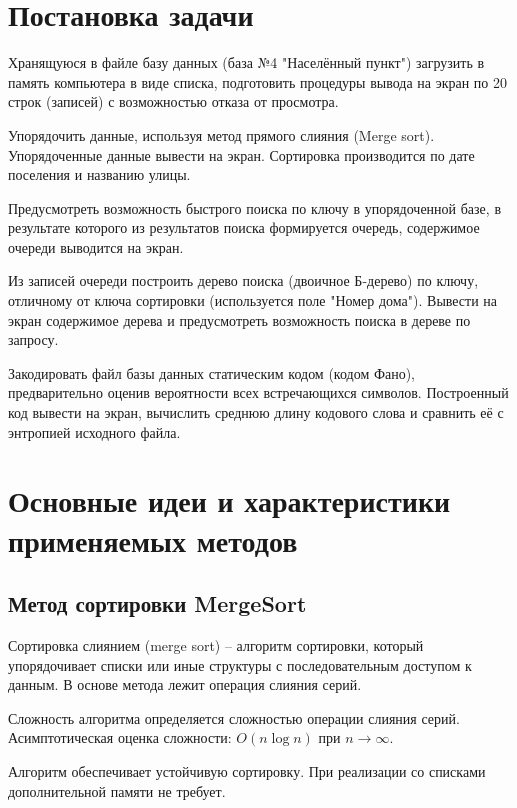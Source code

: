 \documentclass[fleqn]{article}
\begin{document}
\tableofcontents

\newpage

\section{Постановка задачи}

Хранящуюся в файле базу данных {(база №4 "Населённый пункт")} загрузить в память компьютера в виде списка,
подготовить процедуры вывода на экран по 20 строк (записей) с возможностью отказа от просмотра.

Упорядочить данные, используя метод прямого слияния (Merge sort).
Упорядоченные данные вывести на экран.
Сортировка производится по дате поселения и названию улицы.

Предусмотреть возможность быстрого поиска по ключу в упорядоченной базе,
в результате которого из результатов поиска формируется очередь,
содержимое очереди выводится на экран.

Из записей очереди построить дерево поиска (двоичное Б-дерево) по ключу,
отличному от ключа сортировки (используется поле "Номер дома").
Вывести на экран содержимое дерева и предусмотреть возможность
поиска в дереве по запросу.

Закодировать файл базы данных статическим кодом (кодом Фано),
предварительно оценив вероятности всех встречающихся символов.
Построенный код вывести на экран, вычислить среднюю длину кодового слова
и сравнить её с энтропией исходного файла.

\section{Основные идеи и характеристики применяемых методов}

\subsection{Метод сортировки MergeSort}

Сортировка слиянием (merge sort) -- алгоритм сортировки, который упорядочивает списки
или иные структуры с последовательным доступом к данным.
В основе метода лежит операция слияния серий.

Сложность алгоритма определяется сложностью операции слияния серий.
Асимптотическая оценка сложности: $O(n\log n)$ при $n \to \infty$.

Алгоритм обеспечивает устойчивую сортировку. 
При реализации со списками дополнительной памяти не требует.
\end{document}
